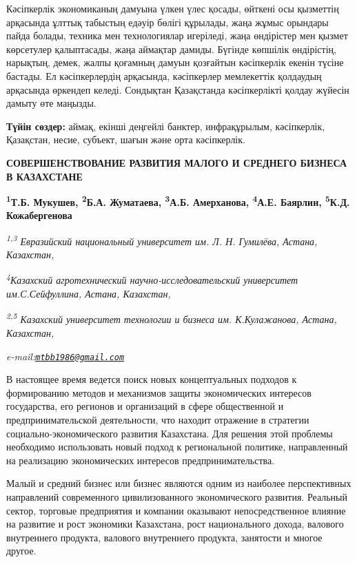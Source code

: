 Кәсіпкерлік экономиканың дамуына үлкен үлес қосады, өйткені осы
қызметтің арқасында ұлттық табыстың едәуір бөлігі құрылады, жаңа жұмыс
орындары пайда болады, техника мен технологиялар игеріледі, жаңа
өндірістер мен қызмет көрсетулер қалыптасады, жаңа аймақтар дамиды.
Бүгінде көпшілік өндірістің, нарықтың, демек, жалпы қоғамның дамуын
қозғайтын кәсіпкерлік екенін түсіне бастады. Ел кәсіпкерлердің
арқасында, кәсіпкерлер мемлекеттік қолдаудың арқасында өркендеп келеді.
Сондықтан Қазақстанда кәсіпкерлікті қолдау жүйесін дамыту өте маңызды.

{\bfseries Түйін сөздер:} аймақ, екінші деңгейлі банктер, инфрақұрылым,
кәсіпкерлік, Қазақстан, несие, субъект, шағын және орта кәсіпкерлік.

\begin{articleheader}
{\bfseries СОВЕРШЕНСТВОВАНИЕ РАЗВИТИЯ МАЛОГО И СРЕДНЕГО БИЗНЕСА В КАЗАХСТАНЕ}

{\bfseries
\textsuperscript{1}Т.Б. Мукушев\textsuperscript{\envelope },
\textsuperscript{2}Б.А. Жуматаева,
\textsuperscript{3}А.Б. Амерханова,
\textsuperscript{4}А.Е. Баярлин,
\textsuperscript{5}К.Д. Кожабергенова}
\end{articleheader}

\begin{affiliation}
\emph{\textsuperscript{1,3} Евразийский национальный университет им. Л. Н. Гумилёва, Астана, Казахстан,}

\emph{\textsuperscript{4}Казахский агротехнический научно-исследовательский университет им.С.Сейфуллина, Астана, Казахстан,}

\emph{\textsuperscript{2,5} Казахский университет технологии и бизнеса им. К.Кулажанова, Астана, Казахстан,}

\emph{e-mail:\href{mailto:mtbb1986@gmail.com}{\nolinkurl{mtbb1986@gmail.com}}}
\end{affiliation}

В настоящее время ведется поиск новых концептуальных подходов к
формированию методов и механизмов защиты экономических интересов
государства, его регионов и организаций в сфере общественной и
предпринимательской деятельности, что находит отражение в стратегии
социально-экономического развития Казахстана. Для решения этой проблемы
необходимо использовать новый подход к региональной политике,
направленный на реализацию экономических интересов предпринимательства.

Малый и средний бизнес или бизнес являются одним из наиболее
перспективных направлений современного цивилизованного экономического
развития. Реальный сектор, торговые предприятия и компании оказывают
непосредственное влияние на развитие и рост экономики Казахстана, рост
национального дохода, валового внутреннего продукта, валового
внутреннего продукта, занятости и многое другое.

